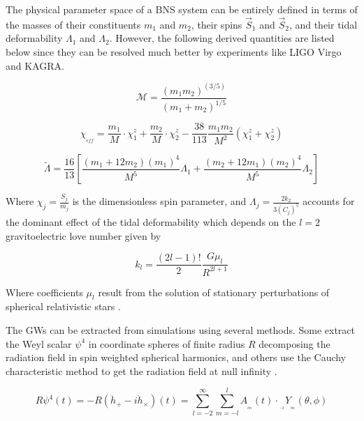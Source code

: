 \FloatBarrier




The physical parameter space of a BNS system can be entirely defined in terms of the masses of their constituents $m_1$ and $m_2$, their spins $\vec{S}_1$ and $\vec{S}_2$, and their tidal deformability $\Lambda_1$ and $\Lambda_2$\cite{Hinderer:2009ca}. However, the following derived quantities are listed below since they can be resolved much better by experiments like LIGO Virgo and KAGRA.

\begin{equation}
\mathcal{M} = \frac{(m_1 m_2)^{(3/5)}}{(m_1 + m_2)^{1/5}}
\end{equation}

\begin{equation}\label{chieff}
\chi_{_{eff}} = \frac{m_1}{M}\cdot \chi_1^z + \frac{m_2}{M}\cdot \chi_2^z - \frac{38}{113} \frac{m_1 m_2}{M^2}(\chi_1^z + \chi_2^z)
\end{equation}


\begin{equation}
\tilde{\Lambda} = \frac{16}{13} \left[ \frac{(m_1 +12m_2)(m_1)^4}{M^5} \Lambda_1 + \frac{(m_2 +12m_1)(m_2)^4}{M^5} \Lambda_2 \right]
\end{equation}

Where $\chi_j = \frac{S_j}{m_j}$ is the dimensionless spin parameter, and $\Lambda_j = \frac{2k_2}{3(C_j)^5}$ accounts for the dominant effect of the tidal deformability  which depends on the $l=2$ gravitoelectric love number given by

\begin{equation}
k_l = \frac{(2l-1)!}{2}\frac{G \mu_l}{R^{2l+1}}
\end{equation}

Where coefficients $\mu_l$ result from the solution of stationary perturbations of spherical relativistic stars \cite{PhysRevD.80.084035,PhysRevD.80.084018,PhysRevD.77.021502,2020GReGr..52..108B}.

The GWs can be extracted from simulations using several methods. Some extract the Weyl scalar $\psi^4$ in coordinate spheres of finite radius $R$ \cite{Bishop:2016lgv,Thorne:1980ru} decomposing the radiation field in spin weighted spherical harmonics, and others use the Cauchy characteristic method to get the radiation field at null infinity \cite{Barkett:2019uae}.

\begin{equation}\label{pso}
R\psi^4(t) = - R(\ddot{h}_+ - i\ddot{h}_\times)(t) = \sum_{l=-2}^{\infty}  \sum_{m=-l}^{l} A_{_{_{lm}}}(t) \cdot {}_{_{_{-2}}}Y_{_{_{lm}}}(\theta, \phi)
\end{equation}

